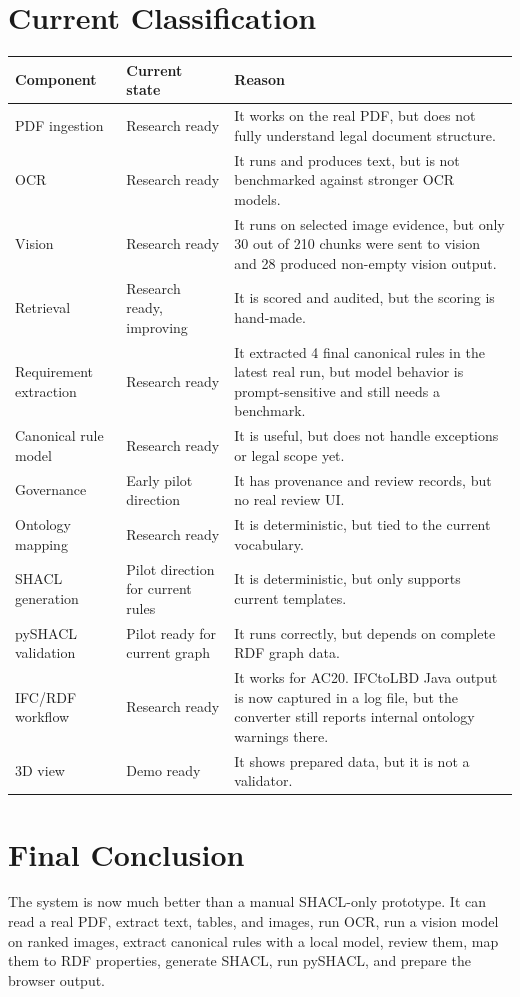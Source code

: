 \documentclass[11pt,a4paper]{article}
\begin{document}
\section{Current Classification}
\begin{longtable}{|p{5cm}|p{4cm}|p{6cm}|}
\hline
\textbf{Component} & \textbf{Current state} & \textbf{Reason} \\
\hline
PDF ingestion & Research ready & It works on the real PDF, but does not fully understand legal document structure. \\
\hline
OCR & Research ready & It runs and produces text, but is not benchmarked against stronger OCR models. \\
\hline
Vision & Research ready & It runs on selected image evidence, but only 30 out of 210 chunks were sent to vision and 28 produced non-empty vision output. \\
\hline
Retrieval & Research ready, improving & It is scored and audited, but the scoring is hand-made. \\
\hline
Requirement extraction & Research ready & It extracted 4 final canonical rules in the latest real run, but model behavior is prompt-sensitive and still needs a benchmark. \\
\hline
Canonical rule model & Research ready & It is useful, but does not handle exceptions or legal scope yet. \\
\hline
Governance & Early pilot direction & It has provenance and review records, but no real review UI. \\
\hline
Ontology mapping & Research ready & It is deterministic, but tied to the current vocabulary. \\
\hline
SHACL generation & Pilot direction for current rules & It is deterministic, but only supports current templates. \\
\hline
pySHACL validation & Pilot ready for current graph & It runs correctly, but depends on complete RDF graph data. \\
\hline
IFC/RDF workflow & Research ready & It works for AC20. IFCtoLBD Java output is now captured in a log file, but the converter still reports internal ontology warnings there. \\
\hline
3D view & Demo ready & It shows prepared data, but it is not a validator. \\
\hline
\end{longtable}

\section{Final Conclusion}
The system is now much better than a manual SHACL-only prototype. It can read a real PDF, extract text, tables, and images, run OCR, run a vision model on ranked images, extract canonical rules with a local model, review them, map them to RDF properties, generate SHACL, run pySHACL, and prepare the browser output.
\end{document}
